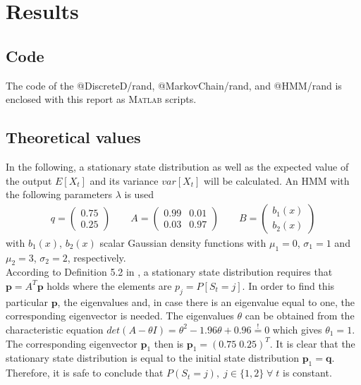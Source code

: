 \documentclass[twocolumn, 10pt]{IEEEtran}
\begin{document}
\section{Results}
\label{results}

\subsection{Code}
The code of the @DiscreteD/rand, @MarkovChain/rand, and @HMM/rand is enclosed with this report as \textsc{Matlab} scripts.

\subsection{Theoretical values}
In the following, a stationary state distribution as well as the expected value of the output $E[X_t]$ and its variance $var[X_t]$ will be calculated. An HMM with the following parameters $\lambda$ is used
\begin{eqnarray}
q = \left( \begin{matrix} 0.75 \\ 0.25 \end{matrix}\right) \qquad 
A = \left( \begin{matrix} 0.99 & 0.01 \\ 0.03 & 0.97 \end{matrix} \right) \qquad 
B =  \left( \begin{matrix} b_1(x) \\ b_2(x) \end{matrix}\right)
\end{eqnarray}
with $b_1(x)$, $b_2(x)$ scalar Gaussian density functions with $\mu_1=0$, $\sigma_1 = 1$ and $\mu_2=3$, $\sigma_2=2$, respectively. \\

According to Definition 5.2 in \cite{CourseBook}, a stationary state distribution requires that $\mathbf{p} = A^T \mathbf{p}$ holds where the elements are $p_j=P[S_t=j]$. In order to find this particular $\mathbf{p}$, the eigenvalues and, in case there is an eigenvalue equal to one, the corresponding eigenvector is needed. The eigenvalues $\theta$ can be obtained from the characteristic equation $det(A-\theta I) = \theta^2 - 1.96\theta + 0.96 \stackrel{!}{=} 0$ which gives $\theta_1 = 1$. The corresponding eigenvector $\mathbf{p}_1$ then is $\mathbf{p}_1 = (0.75 \; 0.25)^T$. It is clear that the stationary state distribution is equal to the initial state distribution $\mathbf{p}_1 = \mathbf{q}$. Therefore, it is safe to conclude that $P(S_t=j), \; j\in\{1,2\} \; \forall \; t$ is constant. \\
\end{document}
